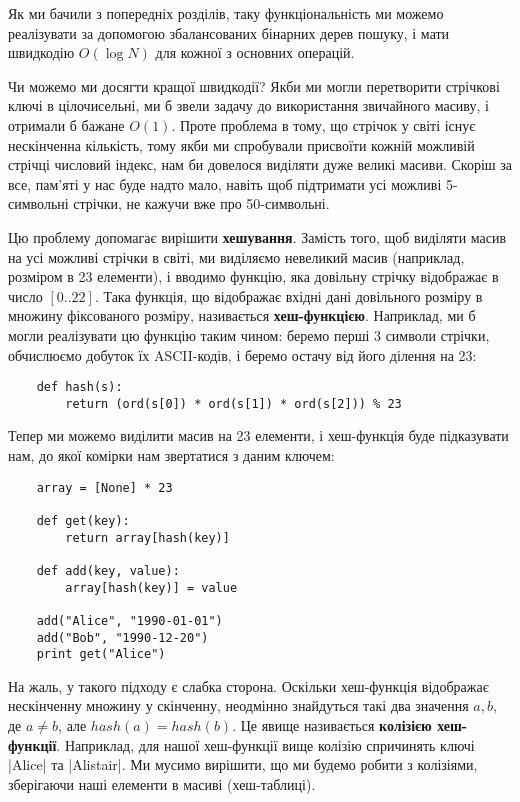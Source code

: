 \documentclass[12pt,a4paper]{report}
\begin{document}
Як ми бачили з попередніх розділів, таку функціональність ми можемо реалізувати за допомогою збалансованих бінарних дерев пошуку, і мати швидкодію \(O(\log N)\) для кожної з основних операцій.

Чи можемо ми досягти кращої швидкодії? Якби ми могли перетворити стрічкові ключі в цілочисельні, ми б звели задачу до використання звичайного масиву, і отримали б бажане \(O(1)\). Проте проблема в тому, що стрічок у світі існує нескінченна кількість, тому якби ми спробували присвоїти кожній можливій стрічці числовий індекс, нам би довелося виділяти дуже великі масиви. Скоріш за все, пам’яті у нас буде надто мало, навіть щоб підтримати усі можливі 5-символьні стрічки, не кажучи вже про 50-символьні.

Цю проблему допомагає вирішити \textbf{хешування}. Замість того, щоб виділяти масив на усі можливі стрічки в світі, ми виділяємо невеликий масив (наприклад, розміром в 23 елементи), і вводимо функцію, яка довільну стрічку відображає в число \([0..22]\). Така функція, що відображає вхідні дані довільного розміру в множину фіксованого розміру, називається \textbf{хеш-функцією}. Наприклад, ми б могли реалізувати цю функцію таким чином: беремо перші 3 символи стрічки, обчислюємо добуток їх ASCII-кодів, і беремо остачу від його ділення на 23:

\begin{lstlisting}
    def hash(s):
        return (ord(s[0]) * ord(s[1]) * ord(s[2])) % 23
\end{lstlisting}

Тепер ми можемо виділити масив на 23 елементи, і хеш-функція буде підказувати нам, до якої комірки нам звертатися з даним ключем:

\begin{lstlisting}
    array = [None] * 23

    def get(key):
        return array[hash(key)]

    def add(key, value):
        array[hash(key)] = value

    add("Alice", "1990-01-01")
    add("Bob", "1990-12-20")
    print get("Alice")
\end{lstlisting}

На жаль, у такого підходу є слабка сторона. Оскільки хеш-функція відображає нескінченну множину у скінченну, неодмінно знайдуться такі два значення \(a, b\), де \(a \neq b\), але \(hash(a) = hash(b)\). Це явище називається \textbf{колізією хеш-функції}. Наприклад, для нашої хеш-функції вище колізію спричинять ключі |Alice| та |Alistair|. Ми мусимо вирішити, що ми будемо робити з колізіями, зберігаючи наші елементи в масиві (хеш-таблиці).
\end{document}
